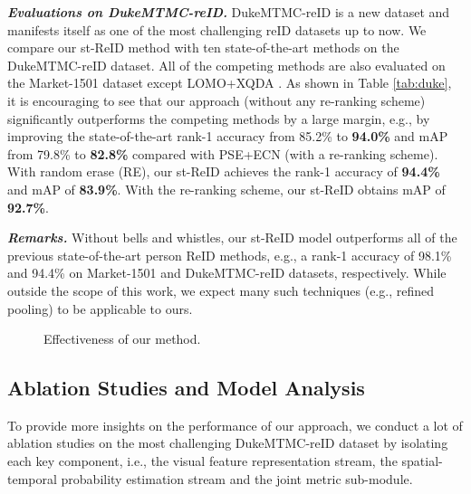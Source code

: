 \documentclass[letterpaper]{article} \usepackage{aaai19}  \usepackage{times}  \usepackage{helvet}  \usepackage{courier}  \usepackage{url}  \usepackage{graphicx}  \usepackage{subfig}
\begin{document}
\textbf{\emph{Evaluations on DukeMTMC-reID.}} DukeMTMC-reID is a new dataset and manifests itself as one of the most challenging reID datasets up to now. We compare our st-ReID method with ten state-of-the-art methods on the DukeMTMC-reID dataset. All of the competing methods are also evaluated on the Market-1501 dataset except LOMO+XQDA \cite{liao2015person}. As shown in Table \ref{tab:duke}, it is encouraging to see that our approach (without any re-ranking scheme) significantly outperforms the competing methods by a large margin, e.g., by improving the state-of-the-art rank-1 accuracy from 85.2\% to \textbf{94.0\%} and mAP from 79.8\% to \textbf{82.8\%} compared with PSE+ECN (with a re-ranking scheme). With random erase (RE), our st-ReID achieves  the rank-1 accuracy of \textbf{94.4\%} and mAP of \textbf{83.9\%}. With the re-ranking scheme, our st-ReID obtains mAP of \textbf{92.7\%}.

\textbf{\emph{Remarks.}} Without bells and whistles, our st-ReID model outperforms all of the previous state-of-the-art person ReID methods, e.g., a rank-1 accuracy of 98.1\% and 94.4\% on Market-1501 and  DukeMTMC-reID datasets, respectively. While outside the scope of this work, we expect many such techniques (e.g., refined pooling) to be applicable to ours.

\begin{figure*}[!t]
\centering
{}
\hfil
{}
\hfil
{}
\hfil
{}
\hfil

\caption{Effectiveness of our method.}
\label{fig:allresult}
\end{figure*}

\subsection{Ablation Studies and Model Analysis}
 To provide more insights on the performance of our approach, we conduct a lot of ablation studies on the most challenging DukeMTMC-reID dataset by isolating each key component, i.e., the visual feature representation stream, the spatial-temporal probability estimation stream and the joint metric sub-module.
\end{document}
